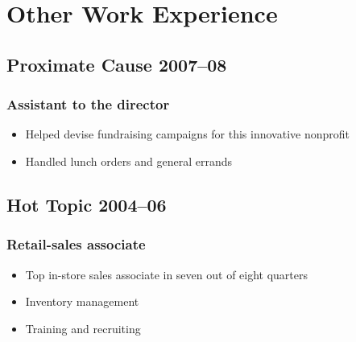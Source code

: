 \documentclass{article}
\begin{document}
\section{Other Work Experience}
	\subsection{Proximate Cause \hfill 2007–08}
	\subsubsection{Assistant to the director}
	\begin{itemize}
		\item Helped devise fundraising campaigns for this innovative nonprofit
		\item Handled lunch orders and general errands
	\end{itemize}
	
	\subsection{Hot Topic \hfill 2004–06}
	\subsubsection{Retail-sales associate}
	\begin{itemize}
		\item Top in-store sales associate in seven out of eight quarters
		\item Inventory management
		\item Training and recruiting
	\end{itemize}
	
\end{document}
